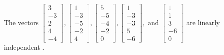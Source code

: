 \begin{exercise}
\begin{exerciseStatement}
  \end{exerciseStatement}
  \begin{exerciseAnswer}
   The vectors \(\left[\begin{array}{r}
3 \\
-3 \\
2 \\
4 \\
-4
\end{array}\right] , \left[\begin{array}{r}
1 \\
-3 \\
-5 \\
-2 \\
4
\end{array}\right] , \left[\begin{array}{r}
5 \\
-5 \\
-4 \\
-2 \\
0
\end{array}\right] , \left[\begin{array}{r}
1 \\
-3 \\
-3 \\
5 \\
-6
\end{array}\right] , \text{ and } \left[\begin{array}{r}
1 \\
1 \\
3 \\
-6 \\
0
\end{array}\right]\) are 
  	 linearly independent  .
  


  \end{exerciseAnswer}
\end{exercise}